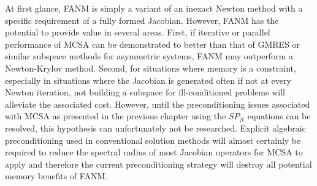 At first glance, FANM is simply a variant of an inexact Newton method
with a specific requirement of a fully formed Jacobian. However, FANM
has the potential to provide value in several areas. First, if
iterative or parallel performance of MCSA can be demonstrated to
better than that of GMRES or similar subspace methods for asymmetric
systems, FANM may outperform a Newton-Krylov method. Second, for
situations where memory is a constraint, especially in situations
where the Jacobian is generated often if not at every Newton
iteration, not building a subspace for ill-conditioned problems will
alleviate the associated cost. However, until the preconditioning
issues associated with MCSA as presented in the previous chapter using
the $SP_N$ equations can be resolved, this hypothesis can
unfortunately not be researched. Explicit algebraic preconditioning
used in conventional solution methods will almost certainly be
required to reduce the spectral radius of most Jacobian operators for
MCSA to apply and therefore the current preconditioning strategy will
destroy all potential memory benefits of FANM.

\clearpage

